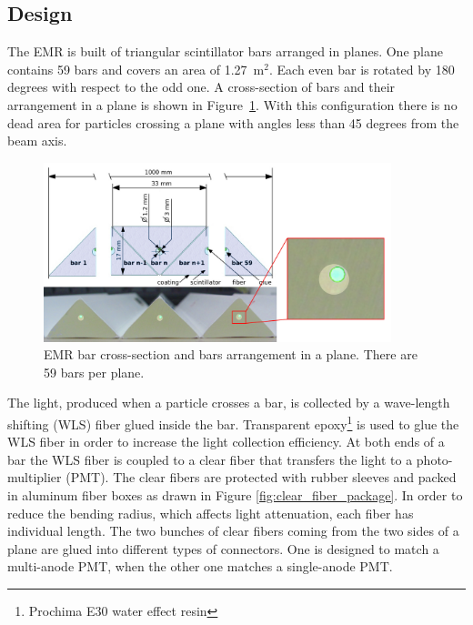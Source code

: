 \documentclass[a4paper,11pt]{article}
\begin{document}
\subsection{Design}
The EMR is built of triangular scintillator bars arranged in planes. 
One plane contains 59 bars and covers an area of 1.27~m$^2$. Each even bar is rotated by 180 degrees with respect to the odd one.
A cross-section of bars and their arrangement in a plane is shown in Figure~\ref{fig:bar_arrangement_in_a_plane}. With this
configuration there is no dead area for particles crossing a plane with angles less than 45 degrees from the beam axis.

\begin{figure}[htp!]
 \centering
 \includegraphics[width=0.9\textwidth]{./bar_arrangement_in_a_plane}
 \caption[EMR bar cross-section and plane arrangement]{EMR bar cross-section and bars arrangement in a plane. There are 59 bars per plane.}
 \label{fig:bar_arrangement_in_a_plane}
\end{figure}


The light, produced when a particle crosses a bar, is collected by a wave-length shifting (WLS) fiber glued inside the bar. 
Transparent epoxy\footnote{Prochima E30 water effect resin} is used to glue the WLS fiber in order to increase the light
collection efficiency. At both ends of a bar the WLS fiber is coupled to a clear fiber that transfers the light to a photo-multiplier
(PMT). The clear fibers are protected with rubber sleeves and packed in aluminum fiber boxes as drawn in Figure 
\ref{fig:clear_fiber_package}. In order to reduce the bending radius, which affects light attenuation, each fiber has individual
length. The two bunches of clear fibers coming from the two sides of a plane are glued into different types of connectors.
One is designed to match a multi-anode PMT, when the other one matches a single-anode PMT.
\end{document}

